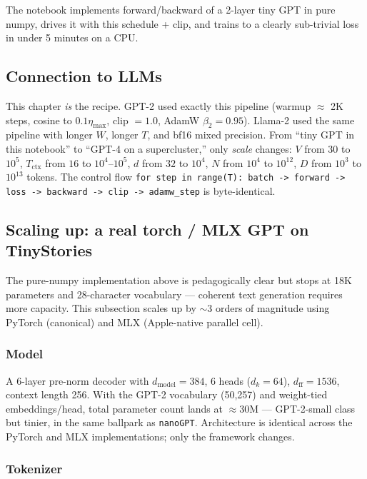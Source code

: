 The notebook implements forward/backward of a 2-layer tiny GPT in pure numpy, drives it with this schedule + clip, and trains to a clearly sub-trivial loss in under 5 minutes on a CPU.

\subsection*{Connection to LLMs}

This chapter \emph{is} the recipe. GPT-2 used exactly this pipeline (warmup $\approx$ 2K steps, cosine to $0.1\eta_{\max}$, clip $=1.0$, AdamW $\beta_2=0.95$). Llama-2 used the same pipeline with longer $W$, longer $T$, and bf16 mixed precision. From ``tiny GPT in this notebook'' to ``GPT-4 on a supercluster,'' only \emph{scale} changes: $V$ from $30$ to $10^5$, $T_{\text{ctx}}$ from $16$ to $10^4$--$10^5$, $d$ from $32$ to $10^4$, $N$ from $10^4$ to $10^{12}$, $D$ from $10^3$ to $10^{13}$ tokens. The control flow \texttt{for step in range(T): batch -> forward -> loss -> backward -> clip -> adamw\_step} is byte-identical.

\subsection*{Scaling up: a real torch / MLX GPT on TinyStories}

The pure-numpy implementation above is pedagogically clear but stops at 18K parameters and 28-character vocabulary --- coherent text generation requires more capacity. This subsection scales up by $\sim$3 orders of magnitude using PyTorch (canonical) and MLX (Apple-native parallel cell).

\subsubsection*{Model}

A 6-layer pre-norm decoder with $d_{\text{model}}=384$, 6 heads ($d_k=64$), $d_{\text{ff}}=1536$, context length 256. With the GPT-2 vocabulary (50{,}257) and weight-tied embeddings/head, total parameter count lands at $\approx 30$M --- GPT-2-small class but tinier, in the same ballpark as \texttt{nanoGPT}. Architecture is identical across the PyTorch and MLX implementations; only the framework changes.

\subsubsection*{Tokenizer}

